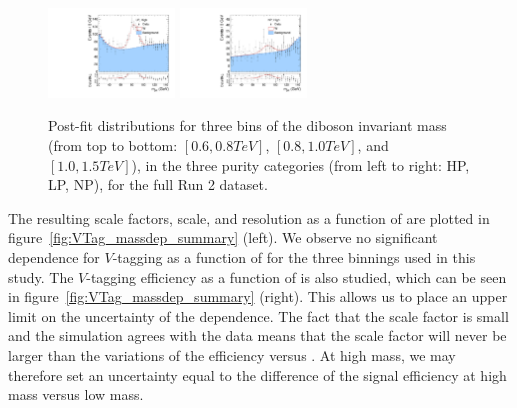 \begin{figure}[htbp]
  \includegraphics[width=0.3\textwidth]{fig/Vtag/PostFit__MJJ__allC_allL_LP_High.pdf}
  \includegraphics[width=0.3\textwidth]{fig/Vtag/PostFit__MJJ__allC_allL_NP_High.pdf}\\
  \caption{
    Post-fit distributions for three bins of the diboson invariant mass \MVV (from top to bottom: $[0.6,0.8\unit{TeV}]$, $[0.8,1.0\unit{TeV}]$, and $[1.0,1.5\unit{TeV}]$), in the three purity categories (from left to right: HP, LP, NP), for the full Run 2 dataset.
  }
  \label{fig:VTag_postfit_massdep}
\end{figure}

The resulting scale factors, scale, and resolution as a function of \MVV are plotted in figure~\ref{fig:VTag_massdep_summary} (left).
We observe no significant dependence for $V$-tagging as a function of \MVV for the three binnings used in this study.
The $V$-tagging efficiency as a function of \MVV is also studied, which can be seen in figure~\ref{fig:VTag_massdep_summary} (right).
This allows us to place an upper limit on the uncertainty of the \pt dependence.
The fact that the scale factor is small and the simulation agrees with the data means that the scale factor will never be larger than the variations of the efficiency versus \MVV. %
At high mass, we may therefore set an uncertainty equal to the difference of the signal efficiency at high mass versus low mass.

